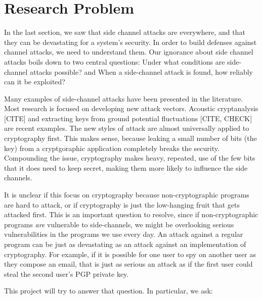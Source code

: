 \documentclass{acm_proc_article-sp}
\begin{document}
\section{Research Problem}
\label{sec:problem}

In the last section, we saw that side channel attacks are everywhere, and that
they can be devastating for a system's security. In order to build defenses
against channel attacks, we need to understand them. Our ignorance about side
channel attacks boils down to two central questions: Under what conditions are
side-channel attacks possible? and When a side-channel attack is found, how
reliably can it be exploited?

Many examples of side-channel attacks have been presented in the literature.
Most research is focused on developing new attack vectors. Acoustic
cryptanalysis [CITE] and extracting keys from ground potential fluctuations
[CITE, CHECK] are recent examples. The new styles of attack are almost
universally applied to cryptography first. This makes sense, because leaking
a small number of bits (the key) from a cryptgoraphic application completely
breaks the security. Compounding the issue, cryptography makes heavy, repeated,
use of the few bits that it does need to keep secret, making them more likely to
influence the side channels.

It is unclear if this focus on cryptography because non-cryptographic programs
are hard to attack, or if cryptography is just the low-hanging fruit that gets
attacked first. This is an important question to resolve, since if
non-cryptographic programs \emph{are} vulnerable to side-channels, we might be
overlooking serious vulnerabilities in the programs we use every day. An attack
against a regular program can be just as devastating as an attack against an
implementation of cryptography. For example, if it is possible for one user to
spy on another user as they compose an email, that is just as serious an attack
as if the first user could steal the second user's PGP private key.

This project will try to answer that question. In particular, we ask:
\end{document}
